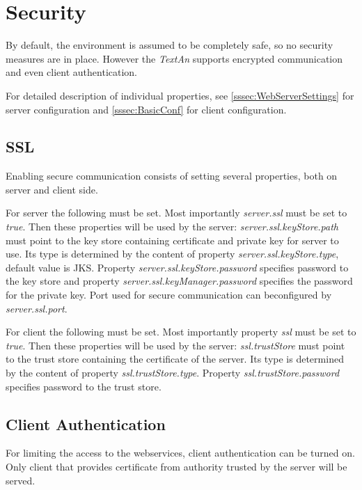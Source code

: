 \documentclass[12pt,a4paper]{report}
\newcommand{\textan}{\emph{TextAn}}
\begin{document}
\section{Security}
\label{sec:Security}

By default, the environment is assumed to be completely safe, so no security
measures are in place. However the \textan{} supports encrypted communication
and even client authentication.

For detailed description of individual properties, see
\ref{sssec:WebServerSettings} for server configuration and
\ref{sssec:BasicConf} for client configuration.

\subsection{SSL}

Enabling secure communication consists of setting several properties, both
on server and client side.

For server the following must be set. Most importantly \emph{server.ssl} must
be set to \emph{true}. Then these properties will be used by the server:
\emph{server.ssl.keyStore.path} must point to the key store containing
certificate and private key for server to use. Its type is determined by
the content of property \emph{server.ssl.keyStore.type}, default value is JKS.
Property \emph{server.ssl.keyStore.password} specifies password to the key
store and property \emph{server.ssl.keyManager.password} specifies the password
for the private key. Port used for secure communication can beconfigured by
\emph{server.ssl.port}.

For client the following must be set. Most importantly property \emph{ssl} must
be set to \emph{true}. Then these properties will be used by the server:
\emph{ssl.trustStore} must point to the trust store containing the certificate
of the server. Its type is determined by the content of property
\emph{ssl.trustStore.type}. Property \emph{ssl.trustStore.password} specifies password to the trust store.

\subsection{Client Authentication}

For limiting the access to the webservices, client authentication can be turned
on. Only client that provides certificate from authority trusted by the server
will be served.
\end{document}

